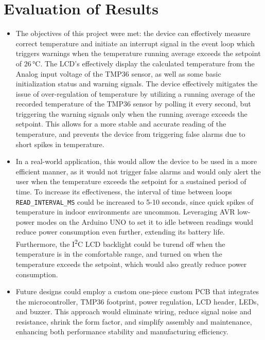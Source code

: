 \documentclass[10pt]{article}
\begin{document}
\section{Evaluation of Results}
\begin{itemize}
	\item The objectives of this
	      project were met: the device can effectively measure correct temperature and
	      initiate an interrupt signal in the event loop which triggers warnings when the
	      temperature running average exceeds the setpoint of $26\,$°C. The LCD's
	      effectively display the calculated temperature from the Analog input voltage of
	      the TMP36 sensor, as well as some basic initialization status and warning
	      signals.  The device effectively mitigates the issue of over-regulation of
	      temperature by utilizing a running average of the recorded temperature of the
	      TMP36 sensor by polling it every second, but triggering the warning signals only
	      when the running average exceeds the setpoint. This allows for a more stable and
	      accurate reading of the temperature, and prevents the device from triggering
	      false alarms due to short spikes in temperature.
	\item In a real-world application,
	      this would allow the device to be used in a more efficient manner, as it would
	      not trigger false alarms and would only alert the user when the temperature
	      exceeds the setpoint for a sustained period of time. To increase its
	      effectiveness, the interval of time between loops \texttt{READ\_INTERVAL\_MS}
	      could be increased to 5-10 seconds, since quick spikes of temperature in indoor
	      environments are uncommon. Leveraging AVR low-power modes on the Arduino UNO
	      to set it to idle between readings would reduce power consumption even further, extending its battery life.
	      Furthermore, the I\textsuperscript{2}C LCD backlight could be turend off when the temperature is in the
	      comfortable range, and turned on when the temperature exceeds the setpoint, which would also greatly reduce power consumption.
	\item Future designs could employ a custom one-piece custom PCB that
	      integrates the microcontroller, TMP36 footprint, power regulation, LCD
	      header, LEDs, and buzzer. This approach would eliminate
	      wiring, reduce signal noise and resistance, shrink the form
	      factor, and simplify assembly and maintenance, enhancing both
	      performance stability and manufacturing efficiency.

\end{itemize}
\end{document}
